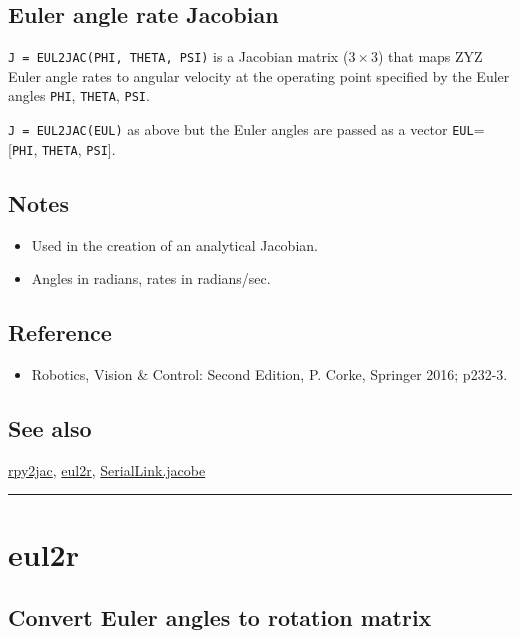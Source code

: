 \subsection*{Euler angle rate Jacobian}


\texttt{J = EUL2JAC(PHI, THETA, PSI)} is a Jacobian matrix ($3 \times 3$) that maps ZYZ Euler angle rates to
angular velocity at the operating point specified by the Euler angles \texttt{PHI}, \texttt{THETA}, \texttt{PSI}.



\texttt{J = EUL2JAC(EUL)}  as above but the Euler angles are passed as a vector \texttt{EUL}=[\texttt{PHI}, \texttt{THETA}, \texttt{PSI}].


\subsection*{Notes}
\begin{itemize}
  \item Used in the creation of an analytical Jacobian.
  \item Angles in radians, rates in radians/sec.
\end{itemize}

\subsection*{Reference}
\begin{itemize}
  \item Robotics, Vision \& Control: Second Edition, P. Corke, Springer 2016; p232-3.
\end{itemize}

\subsection*{See also}


\hyperlink{rpy2jac}{\color{blue} rpy2jac}, \hyperlink{eul2r}{\color{blue} eul2r}, \hyperlink{SerialLink.jacobe}{\color{blue} SerialLink.jacobe}

\vspace{1.5ex}\rule{\textwidth}{1mm}

\hypertarget{eul2r}{\section*{eul2r}}
\subsection*{Convert Euler angles to rotation matrix}


